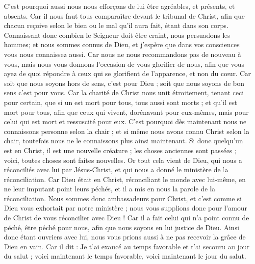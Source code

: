 \begin{multicols}{2}
C'est pourquoi aussi nous nous efforçons de lui être agréables, et présents, et absents.
Car il nous faut tous comparaître devant le tribunal de Christ, afin que chacun reçoive selon le bien ou le mal qu'il aura fait, étant dans son corps.
Connaissant donc combien le Seigneur doit être craint, nous persuadons les hommes; et nous sommes connus de Dieu, et j’espère que dans vos consciences vous nous connaissez aussi.
Car nous ne nous recommandons pas de nouveau à vous, mais nous vous donnons l'occasion de vous glorifier de nous, afin que vous ayez de quoi répondre à ceux qui se glorifient de l'apparence, et non du cœur.
Car soit que nous soyons hors de sens, c’est pour Dieu ; soit que nous soyons de bon sens c’est pour vous.
Car la charité de Christ nous unit étroitement, tenant ceci pour certain, que si un est mort pour tous, tous aussi sont morts ;
et qu'il est mort pour tous, afin que ceux qui vivent, dorénavant pour eux-mêmes, mais pour celui qui est mort et ressuscité pour eux.
C'est pourquoi dès maintenant nous ne connaissons personne selon la chair ; et si même nous avons connu Christ selon la chair, toutefois nous ne le connaissons plus ainsi maintenant.
Si donc quelqu'un est en Christ, il est une nouvelle créature ; les choses anciennes sont passées ; voici, toutes choses sont faites nouvelles.
Or tout cela vient de Dieu, qui nous a réconciliés avec lui par Jésus-Christ, et qui nous a donné le ministère de la réconciliation.
Car Dieu était en Christ, réconciliant le monde avec lui-même, en ne leur imputant point leurs péchés, et il a mis en nous la parole de la réconciliation.
Nous sommes donc ambassadeurs pour Christ, et c'est comme si Dieu vous exhortait par notre ministère ; nous vous supplions donc pour l’amour de Christ de vous réconcilier avec Dieu !
Car il a fait celui qui n'a point connu de péché, être péché pour nous, afin que nous soyons en lui justice de Dieu.
\VerseOne{}Ainsi donc étant ouvriers avec lui, nous vous prions aussi à ne pas recevoir la grâce de Dieu en vain.
Car il dit : Je t'ai exaucé au temps favorable et t'ai secouru au jour du salut ; voici maintenant le temps favorable, voici maintenant le jour du salut.

\end{multicols}

